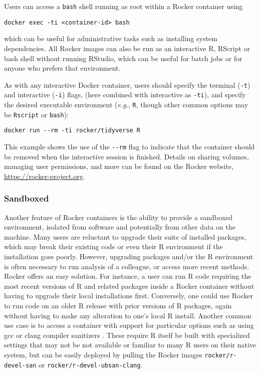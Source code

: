 Users can access a \texttt{bash} shell running as root within a Rocker
container using

\begin{verbatim}
docker exec -ti <container-id> bash
\end{verbatim}

which can be useful for administrative tasks such as installing system
dependencies. All Rocker images can also be run as an interactive R,
RScript or bash shell without running RStudio, which can be useful for
batch jobs or for anyone who prefers that environment.

As with any interactive Docker container, users should specify the
terminal (\texttt{-t}) and interactive (\texttt{-i}) flags, (here
combined with interactive as \texttt{-ti}), and specify the desired
executable environment (\emph{e.g.}, \texttt{R}, though other common
options may be \texttt{Rscript} or \texttt{bash}):

\begin{verbatim}
docker run --rm -ti rocker/tidyverse R
\end{verbatim}

This example shows the use of the \texttt{-\/-rm} flag to indicate that
the container should be removed when the interactive session is
finished. Details on sharing volumes, managing user permissions, and
more can be found on the Rocker website,
\url{https://rocker-project.org}.

\subsubsection{Sandboxed}\label{sandboxed}

Another feature of Rocker containers is the ability to provide a
sandboxed environment, isolated from software and potentially from other
data on the machine. Many users are reluctant to upgrade their suite of
installed packages, which may break their existing code or even their R
environment if the installation goes poorly. However, upgrading packages
and/or the R environment is often necessary to run analysis of a
colleague, or access more recent methods. Rocker offers an easy
solution. For instance, a user can run R code requiring the most recent
versions of R and related packages inside a Rocker container without
having to upgrade their local installations first. Conversely, one could
use Rocker to run code on an older R release with prior versions of R
packages, again without having to make any alteration to one's local R
install. Another common use case is to access a container with support
for particular options such as using gcc or clang compiler sanitizers
\citep{edd_sanitizers}. These require R itself be built with specialized
settings that may not be not available or familiar to many R users on
their native system, but can be easily deployed by pulling the Rocker
images \texttt{rocker/r-devel-san} or
\texttt{rocker/r-devel-ubsan-clang}.

